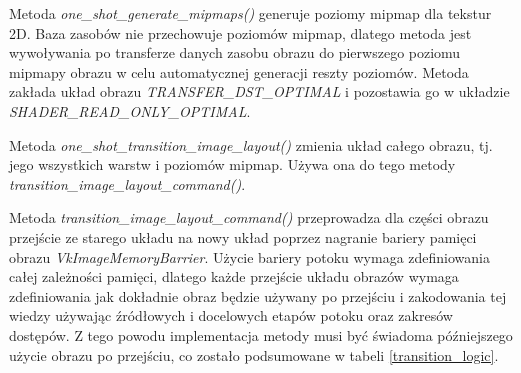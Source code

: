 Metoda \textit{one\_shot\_generate\_mipmaps()} generuje poziomy mipmap dla tekstur 2D. Baza zasobów nie przechowuje poziomów mipmap, dlatego metoda jest wywoływania po transferze danych zasobu obrazu do pierwszego poziomu mipmapy obrazu w celu automatycznej generacji reszty poziomów. Metoda zakłada układ obrazu \textit{TRANSFER\_DST\_OPTIMAL} i pozostawia go w układzie \textit{SHADER\_READ\_ONLY\_OPTIMAL}.

Metoda \textit{one\_shot\_transition\_image\_layout()} zmienia układ całego obrazu, tj. jego wszystkich warstw i poziomów mipmap. Używa ona do tego metody \textit{transition\_image\_layout\_command()}.

Metoda \textit{transition\_image\_layout\_command()} przeprowadza dla części obrazu przejście ze starego układu na nowy układ poprzez nagranie bariery pamięci obrazu \textit{VkImageMemoryBarrier}.
Użycie bariery potoku wymaga zdefiniowania całej zależności pamięci, dlatego każde przejście układu obrazów wymaga zdefiniowania jak dokładnie obraz będzie używany po przejściu i zakodowania tej wiedzy używając źródłowych i docelowych etapów potoku oraz zakresów dostępów.
Z tego powodu implementacja metody musi być świadoma późniejszego użycie obrazu po przejściu, co zostało podsumowane w tabeli \ref{transition_logic}.
